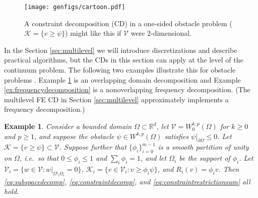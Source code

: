 \documentclass[letterpaper,final,12pt,reqno]{amsart}
\theoremstyle{cstyle}
\theoremstyle{cstyle*}
\theoremstyle{dstyle}
\newtheorem{example}[theorem]{Example}
\numberwithin{equation}{section}
\numberwithin{figure}{section}
\numberwithin{table}{section}
\numberwithin{theorem}{section}
\newcommand{\RR}{\mathbb{R}}
\newcommand{\cK}{\mathcal{K}}
\newcommand{\cV}{\mathcal{V}}
\begin{document}
\begin{figure}[h]
\texttt{[image: genfigs/cartoon.pdf]}
\caption{A constraint decomposition (CD) in a one-sided obstacle problem ($\mathcal{K}=\{v\ge \psi\}$) might like this if $\mathcal{V}$ were 2-dimensional.}
\label{fig:cartoon}
\end{figure}

In the Section \ref{sec:multilevel} we will introduce discretizations and describe practical algorithms, but the CDs in this section can apply at the level of the continuum problem.  The following two examples illustrate this for obstacle problems \cite{GraeserKornhuber2009}.   Example \ref{ex:domaindecomposition} is an overlapping domain decomposition and Example \ref{ex:frequencydecomposition} is a nonoverlapping frequency decomposition.  (The multilevel FE CD in Section \ref{sec:multilevel} approximately implements a frequency decomposition.)

\begin{example}  \label{ex:domaindecomposition}  Consider a bounded domain $\Omega \subset \RR^d$, let $\cV = W_0^{k,p}(\Omega)$ for $k\ge 0$ and $p\ge 1$, and suppose the obstacle $\psi \in W^{k,p}(\Omega)$ satisfies $\psi|_{\partial \Omega} \le 0$.  Let $\cK = \{v \ge \psi\} \subset \cV$.  Suppose further that $\{\phi_i\}_{i=0}^{m-1}$ is a smooth partition of unity on $\Omega$, i.e.~so that $0 \le \phi_i\le 1$ and $\sum_i \phi_i = 1$, and let $\Omega_i$ be the support of $\phi_i$.  Let $\cV_i = \{w \in \cV:w|_{\Omega \setminus \Omega_i} =0 \}$, $\cK_i = \{v \in \cV_i: v \ge \phi_i \psi\}$, and $R_i(v) = \phi_i v$.  Then \eqref{eq:subspacedecomp}, \eqref{eq:constraintdecomp}, and \eqref{eq:constraintrestrictionsum} all hold.
\end{example}

\end{document}
